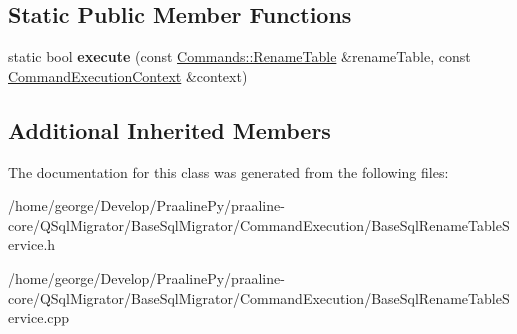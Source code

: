 \subsection*{Static Public Member Functions}
\begin{DoxyCompactItemize}
\item 
\mbox{\label{class_q_sql_migrator_1_1_command_execution_1_1_base_sql_rename_table_service_ab68c97ce6abd3d05b3a208219264d225}} 
static bool {\bfseries execute} (const \hyperlink{class_q_sql_migrator_1_1_commands_1_1_rename_table}{Commands\+::\+Rename\+Table} \&rename\+Table, const \hyperlink{class_q_sql_migrator_1_1_command_execution_1_1_command_execution_context}{Command\+Execution\+Context} \&context)
\end{DoxyCompactItemize}
\subsection*{Additional Inherited Members}


The documentation for this class was generated from the following files\+:\begin{DoxyCompactItemize}
\item 
/home/george/\+Develop/\+Praaline\+Py/praaline-\/core/\+Q\+Sql\+Migrator/\+Base\+Sql\+Migrator/\+Command\+Execution/Base\+Sql\+Rename\+Table\+Service.\+h\item 
/home/george/\+Develop/\+Praaline\+Py/praaline-\/core/\+Q\+Sql\+Migrator/\+Base\+Sql\+Migrator/\+Command\+Execution/Base\+Sql\+Rename\+Table\+Service.\+cpp\end{DoxyCompactItemize}
